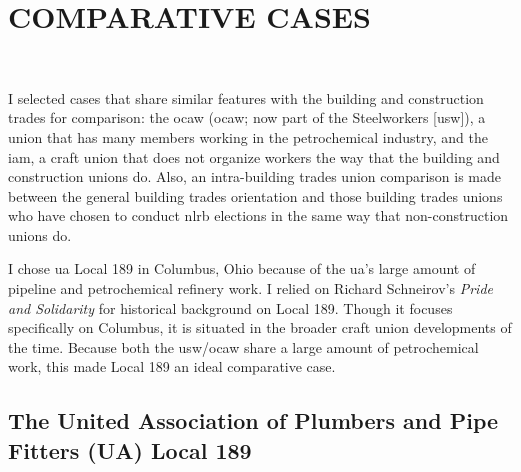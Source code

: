 \documentclass[12pt]{article}
\begin{document}
\section{COMPARATIVE CASES}\

I selected cases that share similar features with the building and construction trades for comparison: the \acrlong{ocaw} (\acrshort{ocaw}; now part of the Steelworkers [\acrshort{usw}]), a union that has many members working in the petrochemical industry, and the \acrfull{iam}, a craft union that does not organize workers the way that the building and construction unions do. Also, an intra-building trades union comparison is made between the general building trades orientation and those building trades unions who have chosen to conduct \acrshort{nlrb} elections in the same way that non-construction unions do.

I chose \acrfull{ua} Local 189 in Columbus, Ohio because of the \acrfull{ua}'s large amount of pipeline and petrochemical refinery work. I relied on Richard Schneirov's \textit{Pride and Solidarity} for historical background on Local 189. Though it focuses specifically on Columbus, it is situated in the broader craft union developments of the time. Because both the \acrfull{usw}/\acrfull{ocaw} share a large amount of petrochemical work, this made Local 189 an ideal comparative case.

\subsection{The United Association of Plumbers and Pipe Fitters (UA) Local 189}\
\end{document}
